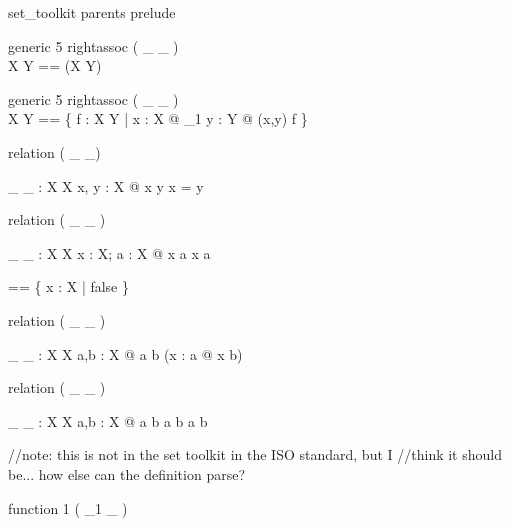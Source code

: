 \zsection set\_toolkit parents prelude\\

\begin{zed}
  generic 5 rightassoc ( \_ \rel \_ )\\
  X \rel Y == \power (X \cross Y)
\end{zed}

\begin{zed}
  generic 5 rightassoc ( \_ \fun \_ )\\
  X \fun Y == \{ f : X \rel Y | \forall x : X @ \exists_1 y : Y @
      (x,y) \in f \}
\end{zed}

\begin{zed}
  relation ( \_ \neq \_)
\end{zed}

\begin{gendef}[X]
  \_ \neq \_ : X \rel X
\where
  \forall x, y : X @ x \neq y \iff \lnot x = y
\end{gendef}

\begin{zed}
  relation ( \_ \notin \_ )
\end{zed}

\begin{gendef}[X]
  \_ \notin \_ : X \rel \power X
\where
  \forall x : X; a : \power X @ x \notin a \iff \lnot x \in a
\end{gendef}

\begin{zed}
  \emptyset [X] == \{ x : X | false \}
\end{zed}

\begin{zed}
  relation ( \_ \subseteq \_ )
\end{zed}

\begin{gendef}[X]
  \_ \subseteq \_ : \power X \rel \power X
\where
  \forall a,b : \power X @ a \subseteq b \iff (\forall x : a @ x \in b)
\end{gendef}

\begin{zed}
  relation ( \_ \subset \_ )
\end{zed}

\begin{gendef}[X]
  \_ \subset \_ : \power X \rel \power X
\where
  \forall a,b : \power X @ a \subset b \iff a \subseteq b \land a \neq b
\end{gendef}

//note: this is not in the set toolkit in the ISO standard, but I
//think it should be... how else can the definition parse?
\begin{zed}
  function 1 ( \power_1 \_ )
\end{zed}

